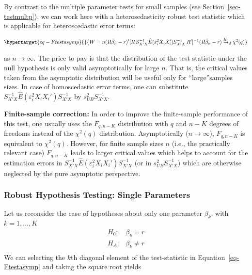 \documentclass[
  letterpaper,
  DIV=11,
  numbers=noendperiod]{scrreprt}
\theoremstyle{definition}
\theoremstyle{plain}
\theoremstyle{plain}
\theoremstyle{remark}
\begin{document}
{By contrast to the multiple parameter tests for small samples (see
Section~\ref{sec-testmultp}), we can work here with a heterosedasticity
robust test statistic which is applicable for heteroscedastic error
terms:

\begin{equation}\protect\hypertarget{eq-Ftestasymp}{}{
W=n(R\hat\beta_n -r)'[R\,S_{X'X}^{-1}\widehat{E}(\varepsilon^2_iX_iX_i')S^{-1}_{X'X}\,R']^{-1}(R\hat\beta_n-r)\overset{H_0}{\to}_d\chi^2(q)
}\label{eq-Ftestasymp}\end{equation}

as \(n\to\infty\). The price to pay is that the distribution of the test
statistic under the null hypothesis is only valid asymptotically for
large \(n\). That is, the critical values taken from the asymptotic
distribution will be useful only for ``large''samples sizes. In case of
homoscedastic error terms, one can substitute
\(S_{X'X}^{-1}\widehat{E}(\varepsilon^2_iX_iX_i')S^{-1}_{X'X}\) by
\(s_{UB}^2S_{X'X}^{-1}\).

\textbf{Finite-sample correction:} In order to improve the finite-sample
performance of this test, one usually uses the \(F_{q,n-K}\)
distribution with \(q\) and \(n-K\) degrees of freedoms instead of the
\(\chi^2(q)\) distribution. Asymptotically (\(n\to\infty\)),
\(F_{q,n-K}\) is equivalent to \(\chi^2(q)\). However, for finite sample
sizes \(n\) (i.e., the practically relevant case) \(F_{q,n-K}\) leads to
larger critical values which helps to account for the estimation errors
in \(S_{X'X}^{-1}\widehat{E}(\varepsilon^2_iX_iX_i')S^{-1}_{X'X}\) (or
in \(s_{UB}^2S_{X'X}^{-1}\)) which are otherwise neglected by the pure
asymptotic perspective.

\hypertarget{robust-hypothesis-testing-single-parameters}{%
\subsubsection{Robust Hypothesis Testing: Single
Parameters}\label{robust-hypothesis-testing-single-parameters}}

Let us reconsider the case of hypotheses about only one parameter
\(\beta_k\), with \(k=1,\dots,K\) \begin{equation*}
\begin{array}{ll}
H_0: & \beta_k=r\\
H_A: & \beta_k\ne r\\
\end{array}
\end{equation*} We can selecting the \(k\)th diagonal element of the
test-statistic in Equation~\ref{eq-Ftestasymp} and taking the square
root yields

}
\end{document}
